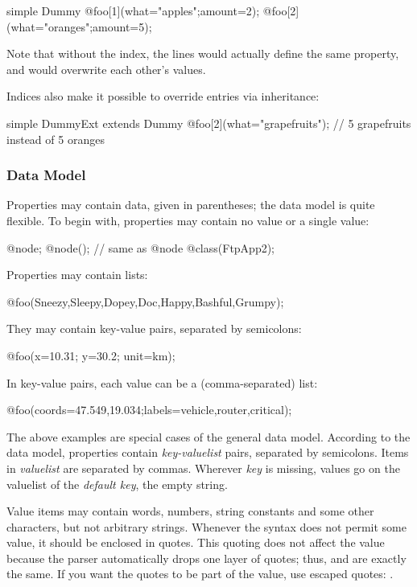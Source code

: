 \begin{ned}
simple Dummy {
    @foo[1](what="apples";amount=2);
    @foo[2](what="oranges";amount=5);
}
\end{ned}

Note that without the index, the lines would actually define the
same  property, and would overwrite each other's values.

Indices also make it possible to override entries via inheritance:

\begin{ned}
simple DummyExt extends Dummy {
    @foo[2](what="grapefruits"); // 5 grapefruits instead of 5 oranges
}
\end{ned}


\subsubsection{Data Model}

Properties may contain data, given in parentheses; the data model is quite
flexible. To begin with, properties may contain no value or a single
value:

\begin{ned}
@node;
@node(); // same as @node
@class(FtpApp2);
\end{ned}

Properties may contain lists:

\begin{ned}
@foo(Sneezy,Sleepy,Dopey,Doc,Happy,Bashful,Grumpy);
\end{ned}

They may contain key-value pairs, separated by semicolons:

\begin{ned}
@foo(x=10.31; y=30.2; unit=km);
\end{ned}

In key-value pairs, each value can be a (comma-separated) list:

\begin{ned}
@foo(coords=47.549,19.034;labels=vehicle,router,critical);
\end{ned}

The above examples are special cases of the general data model. According
to the data model, properties contain \textit{key-valuelist} pairs,
separated by semicolons. Items in \textit{valuelist} are separated by
commas. Wherever \textit{key} is missing, values go on the valuelist of the
\textit{default key}, the empty string.

Value items may contain words, numbers, string constants and some other
characters, but not arbitrary strings.
Whenever the syntax does not permit some value, it should be enclosed in
quotes. This quoting does not affect the value because
the parser automatically drops one layer of quotes; thus, 
and  are exactly the same. If you want the quotes
to be part of the value, use escaped quotes:
.

